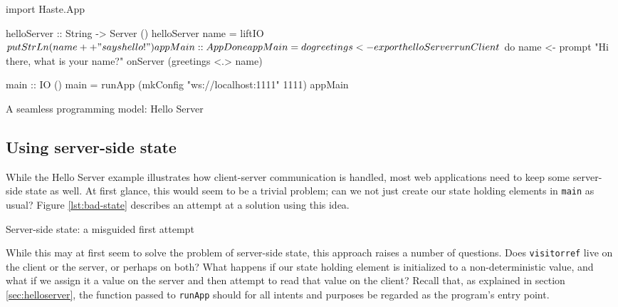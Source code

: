 \documentclass[preprint]{sigplanconf}
\begin{document}
\begin{listingfloat}
\begin{code}
import Haste.App

helloServer :: String -> Server ()
helloServer name =
  liftIO $ putStrLn (name ++ " says hello!")

appMain :: App Done
appMain = do
  greetings <- export helloServer

  runClient $ do
    name <- prompt "Hi there, what is your name?"
    onServer (greetings <.> name)

main :: IO ()
main =
  runApp (mkConfig "ws://localhost:1111" 1111) appMain
\end{code}
\caption{A seamless programming model: Hello Server}
\label{lst:hello-server}
\end{listingfloat}

\subsection{Using server-side state}

While the Hello Server example illustrates how client-server communication is
handled, most web applications need to keep some server-side state as well.
At first glance, this would seem to be a trivial problem; can we not just
create our state holding elements in \lstinline!main! as usual?
Figure \ref{lst:bad-state} describes an attempt at a solution using this idea.

\begin{listingfloat}
\caption{Server-side state: a misguided first attempt}
\label{lst:bad-state}
\end{listingfloat}

While this may at first seem to solve the problem of server-side state, this
approach raises a number of questions. Does \lstinline!visitorref! live on the
client or the server, or perhaps on both? What happens if our state holding
element is initialized to a non-deterministic value, and what if we assign it
a value on the server and then attempt to read that value on the client?
Recall that, as explained in section \ref{sec:helloserver}, the function
passed to \lstinline!runApp! should for all intents and purposes be regarded as
the program's entry point.
\end{document}
